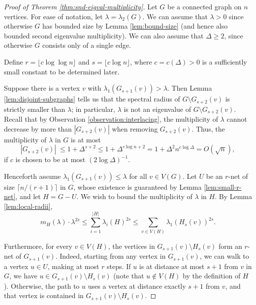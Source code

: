 \begin{proof}[Proof of Theorem \ref{thm:snd-eigval-multiplicity}]
    Let $G$ be a connected graph on $n$ vertices.
    For ease of notation, let $\lambda = \lambda_2(G)$.
    We can assume that $\lambda > 0$ since otherwise $G$ has bounded size by Lemma \ref{lem:bound-size} (and hence also bounded second eigenvalue multiplicity).
    We can also assume that $\Delta \ge 2$, since otherwise $G$ consists only of a single edge.
    
    Define $r = \lfloor c \log \log n \rfloor$ and $s = \lfloor c \log n \rfloor$, where $c = c(\Delta) > 0$ is a sufficiently small constant to be determined later.

    Suppose there is a vertex $v$ with $\lambda_1 (G_{s + 1} (v)) > \lambda$.
    Then Lemma \ref{lem:disjoint-subgraphs} tells us that the spectral radius of $G \setminus G_{s + 2} (v)$ is strictly smaller than $\lambda$; in particular, $\lambda$ is not an eigenvalue of $G \setminus G_{s + 2} (v)$.  
    Recall that by Observation \ref{observation:interlacing}, the multiplicity of $\lambda$ cannot decrease by more than $|G_{s + 2} (v)|$ when removing $G_{s + 2} (v)$. 
    Thus, the multiplicity of $\lambda$ in $G$ is at most 
    \begin{equation*}
        |G_{s + 2} (v)|\; \le 1 + \Delta^{s + 2} \le 1 + \Delta^{c \log n + 2} = 1 + \Delta^2 n^{c \log \Delta} = O(\sqrt{n}),
    \end{equation*}
    if $c$ is chosen to be at most $(2 \log \Delta)^{-1}$.

    Henceforth assume $\lambda_1 (G_{s + 1} (v)) \le \lambda$ for all $v \in V(G)$.
    Let $U$ be an $r$-net of size $\lceil n / (r + 1) \rceil$ in $G$, whose existence is guaranteed by Lemma \ref{lem:small-r-net}, and let $H = G - U$. 
    We wish to bound the multiplicity of $\lambda$ in $H$.
    By Lemma \ref{lem:local-radii},
    \begin{equation*}
        m_H (\lambda) \cdot \lambda^{2s} \le \sum \limits_{i = 1}^{|H|} \lambda_i(H)^{2s} \le \sum \limits_{v \in V(H)} \lambda_1 (H_s (v))^{2s}.
    \end{equation*}

    Furthermore, for every $v \in V(H)$, the vertices in $G_{s + 1} (v) \setminus H_s (v)$ form an $r$-net of $G_{s + 1} (v)$.
    Indeed, starting from any vertex in $G_{s + 1} (v)$, we can walk to a vertex $u \in U$, making at most $r$ steps.
    If $u$ is at distance at most $s + 1$ from $v$ in $G$, we have $u \in G_{s + 1} (v) \setminus H_s (v)$ (note that $u \notin V(H)$ by the definition of $H$).
    Otherwise, the path to $u$ uses a vertex at distance exactly $s + 1$ from $v$, and that vertex is contained in $G_{s + 1} (v) \setminus H_s (v)$.


\end{proof}
